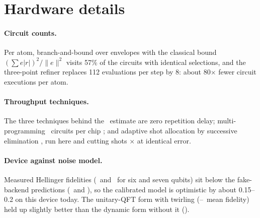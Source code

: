 \documentclass{article}
\providecommand{\qpuUniFid}{--}\providecommand{\qpuUniSel}{--}\providecommand{\qpuUniPeakOK}{--}
\newcommand{\norm}[1]{\lVert #1\rVert}
\begin{document}
\section{Hardware details}
\label{app:hw}
\paragraph{Circuit counts.} Per atom, branch-and-bound over envelopes with the classical bound $(\sum e|r|)^2/\norm{e}^2$ visits 57\% of the circuits with identical selections, and the three-point refiner replaces 112 evaluations per step by 8: about 80$\times$ fewer circuit executions per atom.

\paragraph{Throughput techniques.} The three techniques behind the \speedAllThree\ estimate are zero repetition delay; multi-programming \speedPack\ circuits per chip \citep{niu2023multiprogramming,ohkura2022simultaneous}; and adaptive shot allocation by successive elimination \citep{huang2025gambling}, run here and cutting shots \speedAdaptiveShots$\times$ at identical error.

\paragraph{Device against noise model.} Measured Hellinger fidelities (\qpuSixFid\ and \qpuSevenFid\ for six and seven qubits) sit below the fake-backend predictions (\qpuSixFidSim\ and \qpuSevenFidSim), so the calibrated model is optimistic by about 0.15--0.2 on this device today. The unitary-QFT form with twirling (\qpuUniFid\ mean fidelity) held up slightly better than the dynamic form without it (\qpuDynFid).
\end{document}
